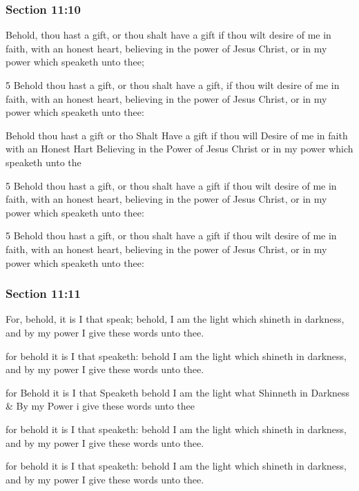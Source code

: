 	\subsubsection{Section 11:10} %
		\label{DC11-10}

		Behold, thou hast a gift, or thou shalt have a gift if thou wilt desire of me in faith, with an honest heart, believing in the power of Jesus Christ, or in my power which speaketh unto thee;

		\begin{framed}
		\scriptsize
			\begin{compactdesc}
				\item[JSP] 5 Behold thou hast a gift, or thou shalt have a gift, if thou wilt desire of me in faith, with an honest heart, believing in the power of Jesus Christ, or in my power which speaketh unto thee:
				\item[HS] Behold thou hast a gift or tho Shalt Have a gift if thou will Desire of me in faith with an Honest Hart Believing in the Power of Jesus Christ or in my power which speaketh unto the
				\item[DC 1835] 5 Behold thou hast a gift, or thou shalt have a gift if thou wilt desire of me in faith, with an honest heart, believing in the power of Jesus Christ, or in my power which speaketh unto thee: 
				\item[DC 1844] 5 Behold thou hast a gift, or thou shalt have a gift if thou wilt desire of me in faith, with an honest heart, believing in the power of Jesus Christ, or in my power which speaketh unto thee: 
			\end{compactdesc}
		\end{framed}

	\subsubsection{Section 11:11} %
		\label{DC11-11}

		For, behold, it is I that speak; behold, I am the light which shineth in darkness, and by my power I give these words unto thee.

		\begin{framed}
		\scriptsize
			\begin{compactdesc}
				\item[JSP] for behold it is I that speaketh: behold I am the light which shineth in darkness, and by my power I give these words unto thee.
				\item[HS] for Behold it is I that Speaketh behold I am the light what Shinneth in Darkness \& By my Power i give these words unto thee 
				\item[DC 1835] for behold it is I that speaketh: behold I am the light which shineth in darkness, and by my power I give these words unto thee.
				\item[DC 1844] for behold it is I that speaketh: behold I am the light which shineth in darkness, and by my power I give these words unto thee.
			\end{compactdesc}
		\end{framed}

